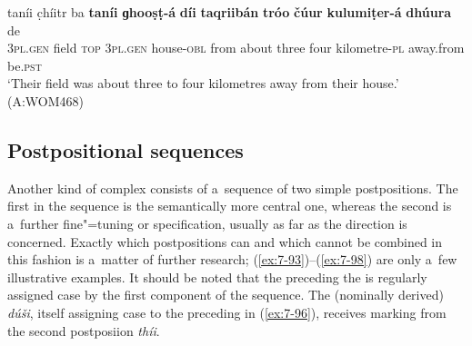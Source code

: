 \begin{exe}
\ea
\label{ex:7-92}
\gll taníi c̣híitr ba \textbf{taníi} \textbf{ɡhooṣṭ-á} \textbf{díi} \textbf{taqriibán} \textbf{tróo} \textbf{čúur} \textbf{kulumiṭer-á} \textbf{dhúura} de\\
\textsc{3pl.gen} field \textsc{top} \textsc{3pl.gen} house-\textsc{obl} from about three four kilometre-\textsc{pl} away.from be.\textsc{pst}\\
\glt `Their field was about three to four kilometres away from their house.' (A:WOM468)
\z

\subsection{Postpositional sequences}
\label{subsec:7-2-4}

Another kind of complex  consists of a~sequence of two simple postpositions. The first in the sequence is the semantically more central one, whereas the second is a~further fine"=tuning or specification, usually as far as the direction is concerned. Exactly which postpositions can and which cannot be combined in this fashion is a~matter of further research; (\ref{ex:7-93})--(\ref{ex:7-98}) are only a~few illustrative examples. It should be noted that the  preceding the  is regularly assigned case by the first component of the sequence. The (nominally derived)  \textit{dúši}, itself assigning  case to the preceding  in (\ref{ex:7-96}), receives  marking from the second postposiion \textit{thíi}.
\largerpage


\end{exe}
